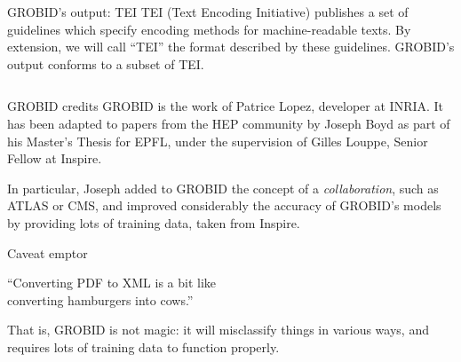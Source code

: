 \documentclass[10pt]{beamer}
\begin{document}
  \begin{frame}{GROBID's output: TEI}
    TEI (Text Encoding Initiative) publishes a set of guidelines which specify
    encoding methods for machine-readable texts. By extension, we will call
    ``TEI'' the format described by these guidelines. GROBID's output conforms
    to a subset of TEI.

    \vspace{0.5cm}

    \inputminted[fontsize=\tiny]{xml}{tex/src/reference.xml}
  \end{frame}

  \begin{frame}{GROBID credits}
    GROBID is the work of Patrice Lopez, developer at INRIA. It has been adapted
    to papers from the HEP community by Joseph Boyd as part of his Master's Thesis
    for EPFL, under the supervision of Gilles Louppe, Senior Fellow at Inspire.

    \vspace{0.5cm}

    In particular, Joseph added to GROBID the concept of a \emph{collaboration},
    such as ATLAS or CMS, and improved considerably the accuracy of GROBID's
    models by providing lots of training data, taken from Inspire.
  \end{frame}

  \begin{frame}{Caveat emptor}
    \begin{framed}
      ``Converting PDF to XML is a bit like\\ converting hamburgers into cows.''

      \vspace{0.25cm}

      \hspace*{}
    \end{framed}

    \vspace{0.5cm}

    That is, GROBID is not magic: it will misclassify things in various ways,
    and requires lots of training data to function properly.
  \end{frame}

  \begin{frame}[plain]
  \end{frame}
\end{document}
